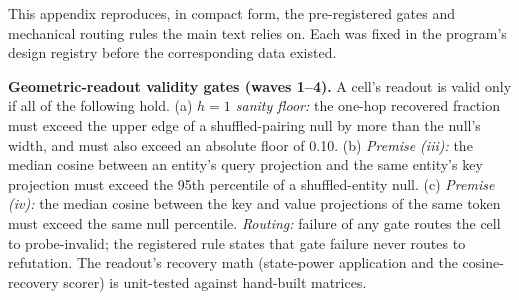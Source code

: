 \documentclass{article} %
\begin{document}
This appendix reproduces, in compact form, the pre-registered gates and
mechanical routing rules the main text relies on. Each was fixed in the
program's design registry before the corresponding data existed.

\textbf{Geometric-readout validity gates (waves 1--4).} A cell's readout is
valid only if all of the following hold. (a) \emph{$h{=}1$ sanity floor:}
the one-hop recovered fraction must exceed the upper edge of a
shuffled-pairing null by more than the null's width, and must also exceed
an absolute floor of 0.10. (b) \emph{Premise (iii):} the median cosine
between an entity's query projection and the same entity's key projection
must exceed the 95th percentile of a shuffled-entity null. (c)
\emph{Premise (iv):} the median cosine between the key and value
projections of the same token must exceed the same null percentile.
\emph{Routing:} failure of any gate routes the cell to probe-invalid; the
registered rule states that gate failure never routes to refutation.
The readout's recovery math (state-power application and the
cosine-recovery scorer) is unit-tested against hand-built matrices.
\end{document}
